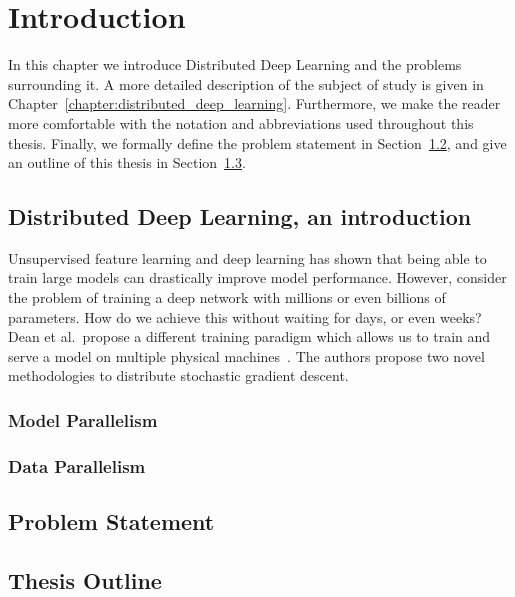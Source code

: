 %
%
%

\chapter{Introduction}
\label{chapter:introduction}

In this chapter we introduce Distributed Deep Learning and the problems surrounding it. A more detailed description of the subject of study is given in Chapter~\ref{chapter:distributed_deep_learning}. Furthermore, we make the reader more comfortable with the notation and abbreviations used throughout this thesis. Finally, we formally define the problem statement in Section~\ref{sec:problem_statement}, and give an outline of this thesis in Section~\ref{sec:thesis_outline}.

\section[Distributed Deep Learning]{Distributed Deep Learning, an introduction}
\label{sec:intro_distributed_deep_learning}

Unsupervised feature learning and deep learning has shown that being able to train large models can drastically improve model performance. However, consider the problem of training a deep network with millions or even billions of parameters. How do we achieve this without waiting for days, or even weeks? Dean et al.~propose a different training paradigm which allows us to train and serve a model on multiple physical machines~\cite{dean2012large}. The authors propose two novel methodologies to distribute stochastic gradient descent.

\subsection{Model Parallelism}
\label{sec:intro_model_parallelism}

\subsection{Data Parallelism}
\label{sec:intro_data_parallelism}

\section{Problem Statement}
\label{sec:problem_statement}

\section{Thesis Outline}
\label{sec:thesis_outline}
